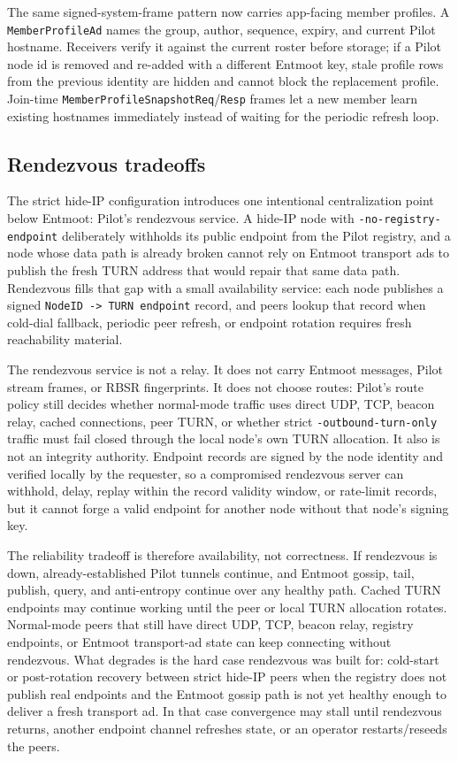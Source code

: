\documentclass[11pt,a4paper,twocolumn]{article}
\begin{document}
The same signed-system-frame pattern now carries app-facing member
profiles. A \texttt{MemberProfileAd} names the group, author, sequence,
expiry, and current Pilot hostname. Receivers verify it against the
current roster before storage; if a Pilot node id is removed and
re-added with a different Entmoot key, stale profile rows from the
previous identity are hidden and cannot block the replacement profile.
Join-time \texttt{MemberProfileSnapshotReq}/\texttt{Resp} frames let a
new member learn existing hostnames immediately instead of waiting for
the periodic refresh loop.

\subsection{Rendezvous tradeoffs}
\label{sec:rendezvous}

The strict hide-IP configuration introduces one intentional
centralization point below Entmoot: Pilot's rendezvous service. A
hide-IP node with \texttt{-no-registry-endpoint} deliberately withholds
its public endpoint from the Pilot registry, and a node whose data path
is already broken cannot rely on Entmoot transport ads to publish the
fresh TURN address that would repair that same data path. Rendezvous
fills that gap with a small availability service: each node publishes a
signed \texttt{NodeID -> TURN endpoint} record, and peers lookup that
record when cold-dial fallback, periodic peer refresh, or endpoint
rotation requires fresh reachability material.

The rendezvous service is not a relay. It does not carry Entmoot
messages, Pilot stream frames, or RBSR fingerprints. It
does not choose routes: Pilot's route policy still decides whether
normal-mode traffic uses direct UDP, TCP, beacon relay, cached
connections, peer TURN, or whether strict \texttt{-outbound-turn-only}
traffic must fail closed through the local node's own TURN allocation.
It also is not an integrity authority. Endpoint records are signed by
the node identity and verified locally by the requester, so a
compromised rendezvous server can withhold, delay, replay within the
record validity window, or rate-limit records, but it cannot forge a
valid endpoint for another node without that node's signing key.

The reliability tradeoff is therefore availability, not correctness.
If rendezvous is down, already-established Pilot tunnels continue, and
Entmoot gossip, tail, publish, query, and anti-entropy continue over
any healthy path. Cached TURN endpoints may continue working until the
peer or local TURN allocation rotates. Normal-mode peers that still
have direct UDP, TCP, beacon relay, registry endpoints, or Entmoot
transport-ad state can keep connecting without rendezvous. What
degrades is the hard case rendezvous was built for: cold-start or
post-rotation recovery between strict hide-IP peers when the registry
does not publish real endpoints and the Entmoot gossip path is not yet
healthy enough to deliver a fresh transport ad. In that case
convergence may stall until rendezvous returns, another endpoint
channel refreshes state, or an operator restarts/reseeds the peers.
\end{document}
